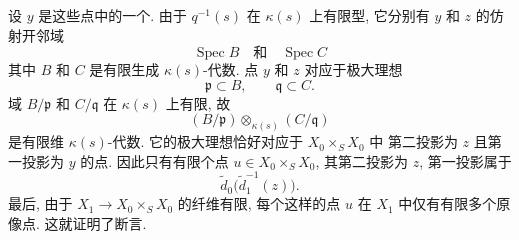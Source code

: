 设 \(y\) 是这些点中的一个.
由于 \(q^{-1}(s)\) 在 \(\kappa(s)\) 上有限型,
它分别有 \(y\) 和 \(z\) 的仿射开邻域
\[
  \operatorname{Spec}B\quad\text{和}\quad\operatorname{Spec}C
\]
其中 \(B\) 和 \(C\) 是有限生成 \(\kappa(s)\)-代数.
点 \(y\) 和 \(z\) 对应于极大理想
\[
  \mathfrak p\subset B,\qquad \mathfrak q\subset C.
\]
域 \(B/\mathfrak p\) 和 \(C/\mathfrak q\)
在 \(\kappa(s)\) 上有限, 故
\[
  (B/\mathfrak p)\otimes_{\kappa(s)}(C/\mathfrak q)
\]
是有限维 \(\kappa(s)\)-代数.
它的极大理想恰好对应于 \(X_0\times_S X_0\) 中
第二投影为 \(z\) 且第一投影为 \(y\) 的点.
因此只有有限个点 \(u\in X_0\times_S X_0\),
其第二投影为 \(z\), 第一投影属于
\[
  \widetilde d_0\bigl(\widetilde d_1^{-1}(z)\bigr).
\]
最后, 由于 \(X_1\to X_0\times_S X_0\) 的纤维有限,
每个这样的点 \(u\) 在 \(X_1\) 中仅有有限多个原像点.
这就证明了断言.

